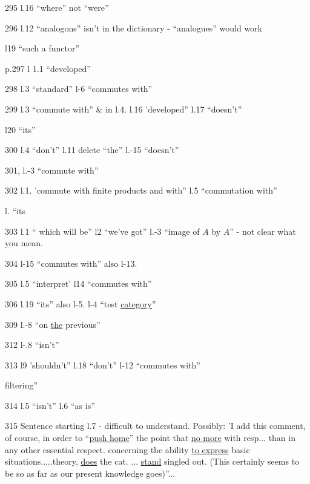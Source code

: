 295 l.16 ``where'' not ``were''

296 l.12 ``analogons'' isn't in the dictionary - ``analogues'' would work

l19 ``such a functor''

p.297 l 1.1 ``developed''

298 l.3 ``standard'' l-6 ``commutes with''

299 l.3 ``commute with'' \& in l.4. l.16 'developed'' l.17 ``doesn't''

l20 ``its''

300 l.4 ``don't'' l.11 delete ``the'' l.-15 ``doesn't''

301, l.-3 ``commute with''

302 l.1. 'commute with  finite products and with'' l.5 ``commutation with''


 l. ``its

303 l.1 `` which will be'' l2 ``we've got'' l.-3 ``image of $A$ by $A$'' - not clear what you mean.

304 l-15 ``commutes with'' also l-13. 

305 l.5 ``interpret' l14 ``commutes with''

306 l.19 ``its''  also l-5. l-4 ``test \uline{category}''

309 l.-8 ``on \uline{the} previous''

312 l-.8 ``isn't'' 

313 l9 'shouldn't'' l.18 ``don't'' l-12 ``commutes with''

  filtering''

314 l.5 ``isn't'' l.6 ``as is''

315 Sentence starting l.7 - difficult to understand. Possibly: 'I add this comment, of course,  in order to ``\uline{push home}'' the point that \uline{no more} with resp... than in any other essential respect. concerning the ability \uline{to express} basic situations.....theory, \uline{does} the cat. ... \uline{stand} singled out.  (This certainly seems to be so as far as our present knowledge goes)''...

